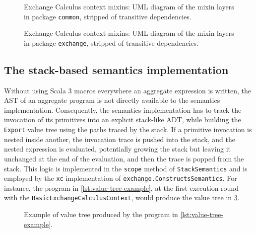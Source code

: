 \begin{figure}
    \centering
    \caption{Exchange Calculus context mixins: \ac{UML} diagram of the mixin layers in package \texttt{common}, stripped of transitive dependencies.}
    \label{fig:context-mixins-common}
    \bigskip
    \resizebox{\linewidth}{!}{
        
    }
\end{figure}

\begin{figure}
    \centering
    \caption{Exchange Calculus context mixins: \ac{UML} diagram of the mixin layers in package \texttt{exchange}, stripped of transitive dependencies.}
    \label{fig:context-mixins-exchange}
    \bigskip
    \resizebox{\linewidth}{!}{
        
    }
\end{figure}


\subsection{The stack-based semantics implementation}

Without using Scala 3 macros everywhere an aggregate expression is written, the \ac{AST} of an aggregate program is not directly available to the semantics implementation.
%
Consequently, the semantics implementation has to track the invocation of its primitives into an explicit stack-like \ac{ADT}, while building the \texttt{Export} value tree using the paths traced by the stack.
%
If a primitive invocation is nested inside another, the invocation trace is pushed into the stack, and the nested expression is evaluated, potentially growing the stack but leaving it unchanged at the end of the evaluation, and then the trace is popped from the stack.
%
This logic is implemented in the \texttt{scope} method of \texttt{StackSemantics} and is employed by the \texttt{xc} implementation of \texttt{exchange.ConstructsSemantics}.
%
For instance, the program in \cref{lst:value-tree-example}, at the first execution round with the \texttt{BasicExchangeCalculusContext}, would produce the value tree in \cref{fig:value-tree-example}.



\begin{figure}
    \centering
    \caption{Example of value tree produced by the program in \cref{lst:value-tree-example}.}
    \label{fig:value-tree-example}
    \bigskip
    \resizebox{0.5\linewidth}{!}{
        
    }
\end{figure}

